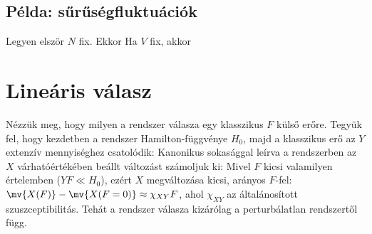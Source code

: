   \subsection{Példa: sűrűségfluktuációk}
   
   Legyen elször $N$ fix.
   Ekkor
   Ha $V$ fix, akkor 
   
 \section{Lineáris válasz}\label{ss:B05-linvalasz}
  
  Nézzük meg, hogy milyen a rendszer válasza egy klasszikus $F$ külső erőre.
   Tegyük fel, hogy kezdetben a rendszer Hamilton-függvénye $H_0$, majd a klasszikus erő az $Y$ extenzív mennyiséghez csatolódik:
  Kanonikus sokasággal leírva a rendszerben az $X$ várhatóértékében beállt változást számoljuk ki:
  Mivel $F$ kicsi valamilyen értelemben ($YF\ll H_0$), ezért $X$ megváltozása kicsi, arányos $F$-fel: $\mv{X(F)}-\mv{X(F=0)}\approx\chi_{XY} F$, ahol $\chi_{XY}$ az általánosított szuszceptibilitás. 
  Tehát a rendszer válasza kizárólag a perturbálatlan rendszertől függ.

